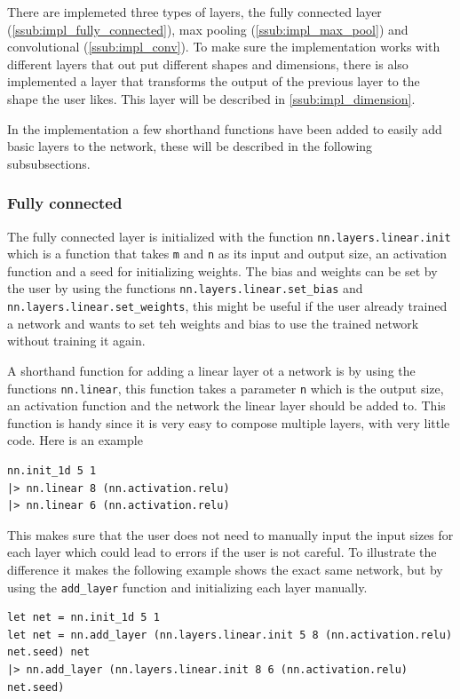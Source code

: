 There are implemeted three types of layers, the fully connected layer (\autoref{ssub:impl_fully_connected}), max pooling (\autoref{ssub:impl_max_pool}) and convolutional (\autoref{ssub:impl_conv}).
To make sure the implementation works with different layers that out put different shapes and dimensions, there is also implemented a layer that transforms the output of the previous layer to the shape the user likes. This layer will be described in \autoref{ssub:impl_dimension}.

In the implementation a few shorthand functions have been added to easily add basic layers to the network, these will be described in the following subsubsections.

\subsubsection{Fully connected}%
\label{ssub:impl_fully_connected}

The fully connected layer is initialized with the function \texttt{nn.layers.linear.init} which is a function that takes \texttt{m} and \texttt{n} as its input and output size, an activation function and a seed for initializing weights.
The bias and weights can be set by the user by using the functions \texttt{nn.layers.linear.set\_bias} and \texttt{nn.layers.linear.set\_weights}, this might be useful if the user already trained a network and wants to set teh weights and bias to use the trained network without training it again.

A shorthand function for adding a linear layer ot a network is by using the functions \texttt{nn.linear}, this function takes a parameter \texttt{n} which is the output size, an activation function and the network the linear layer should be added to. This function is handy since it is very easy to compose multiple layers, with very little code. Here is an example

\begin{lstlisting}
nn.init_1d 5 1
|> nn.linear 8 (nn.activation.relu)
|> nn.linear 6 (nn.activation.relu)
\end{lstlisting}

This makes sure that the user does not need to manually input the input sizes for each layer which could lead to errors if the user is not careful.
To illustrate the difference it makes the following example shows the exact same network, but by using the \texttt{add\_layer} function and initializing each layer manually.

\begin{lstlisting}
let net = nn.init_1d 5 1
let net = nn.add_layer (nn.layers.linear.init 5 8 (nn.activation.relu) net.seed) net
|> nn.add_layer (nn.layers.linear.init 8 6 (nn.activation.relu) net.seed)
\end{lstlisting}

